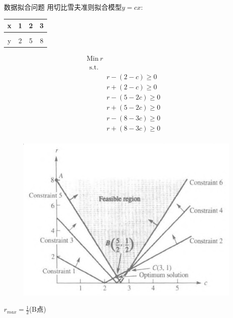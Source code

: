 \documentclass[mathserif, table]{beamer}
\begin{document}
\begin{frame}{数据拟合问题}
  用切比雪夫准则拟合模型$y=cx$:\quad{}
  \begin{tabular}{c|ccc}
    x & 1 & 2 & 3\\
    \hline\\[-20pt]
    y & 2 & 5 & 8
  \end{tabular}

  \begin{figure}
    \begin{minipage}{.5\linewidth}
    \[ 
    \begin{array}{c}
      \mbox{Min}\ r\\
      \begin{array}{ll}
        \mbox{s.t.} & \\
        &
        \begin{array}{r}
          r - (2 - c) \ge 0 \\
          r + (2 - c) \ge 0 \\
          r - (5 -2c) \ge 0 \\
          r + (5 - 2c) \ge 0 \\
          r - (8 - 3c) \ge 0 \\
          r + (8 - 3c) \ge 0
        \end{array}
      \end{array}
    \end{array}
    \]
    \end{minipage}%
    \begin{minipage}{.5\linewidth}
      \includegraphics[width=\textwidth{}]{datafit.png}
    \end{minipage}
  \end{figure}
  
  $r_{max} = \frac{1}{2}$(B点)
  
\end{frame}
\end{document}
